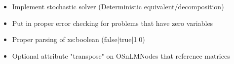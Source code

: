 \begin{itemize}
\item Implement stochastic solver (Deterministic equivalent/decomposition)

\item Put in proper error checking for problems that have zero variables



\item Proper parsing of xs:boolean (false|true|1|0)

\item Optional attribute "transpose" on OSnLMNodes that reference matrices

\end{itemize}


\ifbible

\label{section:wishlist} 

